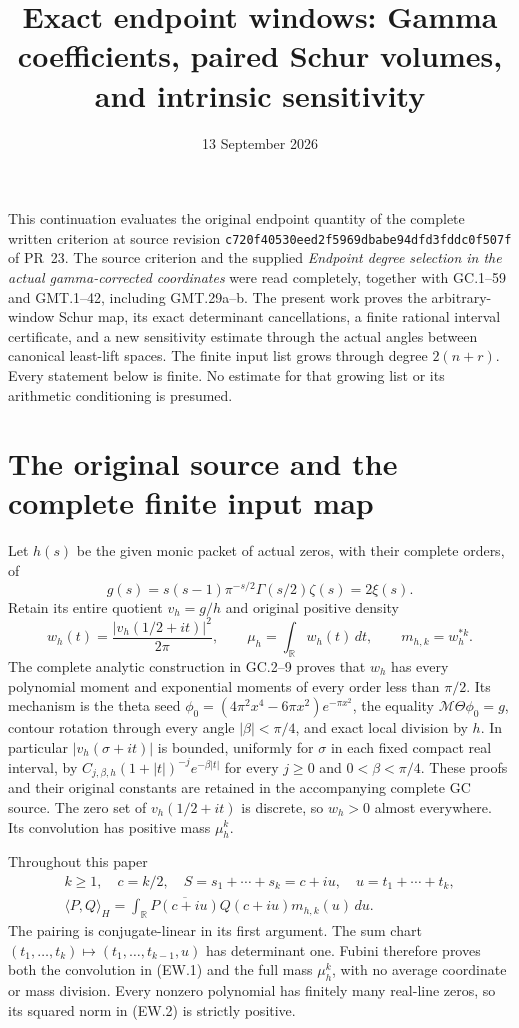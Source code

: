 \documentclass[11pt]{article}
\title{Exact endpoint windows: Gamma coefficients, paired Schur volumes,
and intrinsic sensitivity}
\author{}
\date{13 September 2026}
\newcommand{\R}{\mathbb R}
\begin{document}
\maketitle

This continuation evaluates the original endpoint quantity of the complete
written criterion at source revision
\texttt{c720f40530eed2f5969dbabe94dfd3fddc0f507f} of PR~23.
The source criterion and the supplied \emph{Endpoint degree selection in
the actual gamma-corrected coordinates} were read completely, together
with GC.1--59 and GMT.1--42, including GMT.29a--b. The present work proves
the arbitrary-window Schur map, its exact determinant cancellations, a
finite rational interval certificate, and a new sensitivity estimate
through the actual angles between canonical least-lift spaces. The
finite input list grows through degree $2(n+r)$. Every statement below
is finite. No estimate for that growing list or its arithmetic
conditioning is presumed.

\section{The original source and the complete finite input map}

Let $h(s)$ be the given monic packet of actual zeros, with their complete
orders, of
\[
 g(s)=s(s-1)\pi^{-s/2}\Gamma(s/2)\zeta(s)=2\xi(s).
\]
Retain its entire quotient $v_h=g/h$ and original positive density
\[
 w_h(t)=\frac{|v_h(1/2+it)|^2}{2\pi},\qquad
 \mu_h=\int_\R w_h(t)\,dt,\qquad m_{h,k}=w_h^{*k}.
                                                               \tag{EW.1}
\]
The complete analytic construction in GC.2--9 proves that $w_h$ has
every polynomial moment and exponential moments of every order less
than $\pi/2$. Its mechanism is the theta seed
$\phi_0=(4\pi^2x^4-6\pi x^2)e^{-\pi x^2}$, the equality
$\mathcal M\Theta\phi_0=g$, contour rotation through every angle
$|\beta|<\pi/4$, and exact local division by $h$.
In particular $|v_h(\sigma+it)|$ is bounded, uniformly for $\sigma$
in each fixed compact real interval, by
$C_{j,\beta,h}(1+|t|)^{-j}e^{-\beta|t|}$ for every
$j\ge0$ and $0<\beta<\pi/4$. These proofs and their original
constants are retained in the accompanying complete GC source.
The zero set of $v_h(1/2+it)$ is discrete, so $w_h>0$ almost
everywhere. Its convolution has positive mass $\mu_h^k$.

Throughout this paper
\[
 \begin{gathered}
 k\ge1,\quad c=k/2,\quad S=s_1+\cdots+s_k=c+iu,
 \quad u=t_1+\cdots+t_k,\\
 \langle P,Q\rangle_H=
 \int_\R\overline{P(c+iu)}Q(c+iu)m_{h,k}(u)\,du.
 \end{gathered}                                               \tag{EW.2}
\]
The pairing is conjugate-linear in its first argument. The sum chart
$(t_1,\ldots,t_k)\mapsto(t_1,\ldots,t_{k-1},u)$ has determinant
one. Fubini therefore proves both the convolution in (EW.1) and the
full mass $\mu_h^k$, with no average coordinate or mass division.
Every nonzero polynomial has finitely many real-line zeros, so its
squared norm in (EW.2) is strictly positive.
\end{document}
